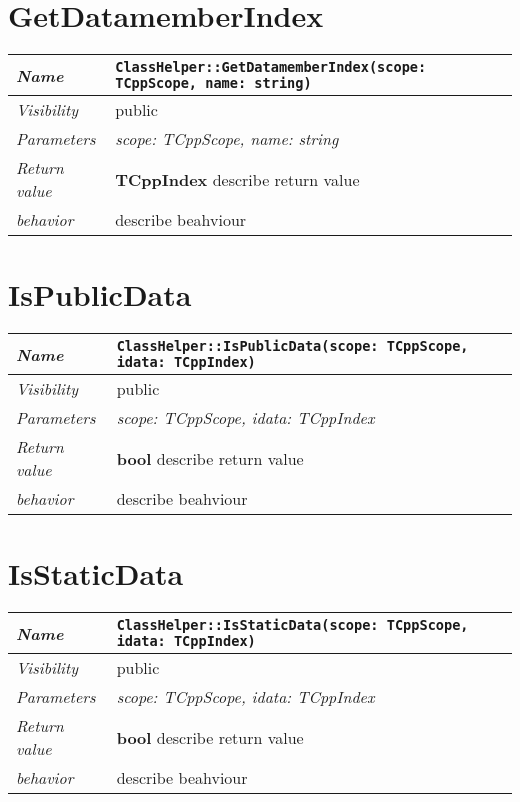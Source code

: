  \section{GetDatamemberIndex}
\begin{longtable}{p{3cm} @{\hskip 1cm} p{12cm}}
 \hline
\textit{Name} & \texttt{ClassHelper::GetDatamemberIndex(scope: TCppScope, name: string)}\\
\hline
 \textit{Visibility} & public\\
\hline
\textit{Parameters} & \textit{scope: TCppScope, name: string}\\
\hline
\textit{Return value} & \textbf{ TCppIndex} describe return value\\
  \hline
 \textit{behavior} & describe beahviour \\
\hline
\end{longtable} \pagebreak
 \section{IsPublicData}
\begin{longtable}{p{3cm} @{\hskip 1cm} p{12cm}}
 \hline
\textit{Name} & \texttt{ClassHelper::IsPublicData(scope: TCppScope, idata: TCppIndex)}\\
\hline
 \textit{Visibility} & public\\
\hline
\textit{Parameters} & \textit{scope: TCppScope, idata: TCppIndex}\\
\hline
\textit{Return value} & \textbf{ bool} describe return value\\
  \hline
 \textit{behavior} & describe beahviour \\
\hline
\end{longtable} \pagebreak
 \section{IsStaticData}
\begin{longtable}{p{3cm} @{\hskip 1cm} p{12cm}}
 \hline
\textit{Name} & \texttt{ClassHelper::IsStaticData(scope: TCppScope, idata: TCppIndex)}\\
\hline
 \textit{Visibility} & public\\
\hline
\textit{Parameters} & \textit{scope: TCppScope, idata: TCppIndex}\\
\hline
\textit{Return value} & \textbf{ bool} describe return value\\
  \hline
 \textit{behavior} & describe beahviour \\
\hline
\end{longtable} \pagebreak
